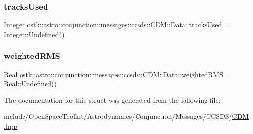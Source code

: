 \subsubsection{\texorpdfstring{tracks\+Used}{tracksUsed}}
{\footnotesize\ttfamily Integer ostk\+::astro\+::conjunction\+::messages\+::ccsds\+::\+C\+D\+M\+::\+Data\+::tracks\+Used = Integer\+::\+Undefined()}

\mbox{\label{structostk_1_1astro_1_1conjunction_1_1messages_1_1ccsds_1_1_c_d_m_1_1_data_ace9f33401b6e7a3efe39207ae1c37467}} 
\subsubsection{\texorpdfstring{weighted\+R\+MS}{weightedRMS}}
{\footnotesize\ttfamily Real ostk\+::astro\+::conjunction\+::messages\+::ccsds\+::\+C\+D\+M\+::\+Data\+::weighted\+R\+MS = Real\+::\+Undefined()}



The documentation for this struct was generated from the following file\+:\begin{DoxyCompactItemize}
\item 
include/\+Open\+Space\+Toolkit/\+Astrodynamics/\+Conjunction/\+Messages/\+C\+C\+S\+D\+S/\hyperlink{_c_d_m_8hpp}{C\+D\+M.\+hpp}\end{DoxyCompactItemize}
